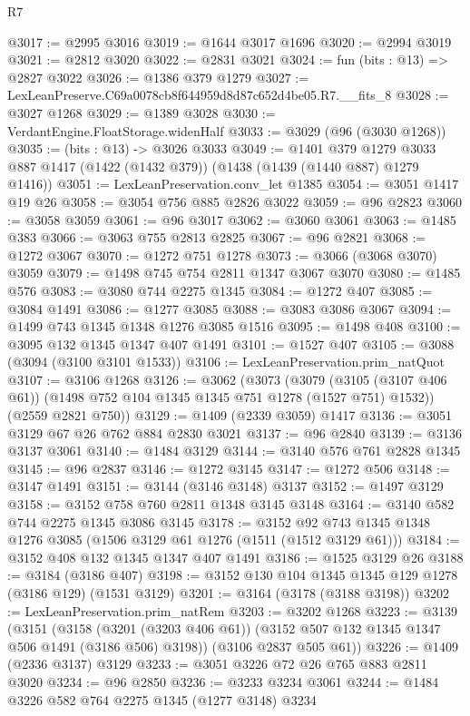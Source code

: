 \begin{lexlean}{R7}
\begin{coremodule}
@3017 := @2995 @3016
@3019 := @1644 @3017 @1696
@3020 := @2994 @3019
@3021 := @2812 @3020
@3022 := @2831 @3021
@3024 := fun (bits : @13) => @2827 @3022
@3026 := @1386 @379 @1279
@3027 := LexLeanPreserve.C69a0078cb8f644959d8d87c652d4be05.R7.__fits_8
@3028 := @3027 @1268
@3029 := @1389 @3028
@3030 := VerdantEngine.FloatStorage.widenHalf
@3033 := @3029 (@96 (@3030 @1268))
@3035 := (bits : @13) -> @3026 @3033
@3049 := @1401
    @379
    @1279
    @3033
    @887
    @1417
    (@1422 (@1432 @379))
    (@1438 (@1439 (@1440 @887) @1279 @1416))
@3051 := LexLeanPreservation.conv_let @1385
@3054 := @3051 @1417 @19 @26
@3058 := @3054 @756 @885 @2826 @3022
@3059 := @96 @2823
@3060 := @3058 @3059
@3061 := @96 @3017
@3062 := @3060 @3061
@3063 := @1485 @383
@3066 := @3063 @755 @2813 @2825
@3067 := @96 @2821
@3068 := @1272 @3067
@3070 := @1272 @751 @1278
@3073 := @3066 (@3068 @3070) @3059
@3079 := @1498 @745 @754 @2811 @1347 @3067 @3070
@3080 := @1485 @576
@3083 := @3080 @744 @2275 @1345
@3084 := @1272 @407
@3085 := @3084 @1491
@3086 := @1277 @3085
@3088 := @3083 @3086 @3067
@3094 := @1499 @743 @1345 @1348 @1276 @3085 @1516
@3095 := @1498 @408
@3100 := @3095 @132 @1345 @1347 @407 @1491
@3101 := @1527 @407
@3105 := @3088 (@3094 (@3100 @3101 @1533))
@3106 := LexLeanPreservation.prim_natQuot
@3107 := @3106 @1268
@3126 := @3062
    (@3073
      (@3079 (@3105 (@3107 @406 @61)) (@1498 @752 @104 @1345 @1345 @751 @1278 (@1527 @751) @1532))
      (@2559 @2821 @750))
@3129 := @1409 (@2339 @3059) @1417
@3136 := @3051 @3129 @67 @26 @762 @884 @2830 @3021
@3137 := @96 @2840
@3139 := @3136 @3137 @3061
@3140 := @1484 @3129
@3144 := @3140 @576 @761 @2828 @1345
@3145 := @96 @2837
@3146 := @1272 @3145
@3147 := @1272 @506
@3148 := @3147 @1491
@3151 := @3144 (@3146 @3148) @3137
@3152 := @1497 @3129
@3158 := @3152 @758 @760 @2811 @1348 @3145 @3148
@3164 := @3140 @582 @744 @2275 @1345 @3086 @3145
@3178 := @3152 @92 @743 @1345 @1348 @1276 @3085 (@1506 @3129 @61 @1276 (@1511 (@1512 @3129 @61)))
@3184 := @3152 @408 @132 @1345 @1347 @407 @1491
@3186 := @1525 @3129 @26
@3188 := @3184 (@3186 @407)
@3198 := @3152 @130 @104 @1345 @1345 @129 @1278 (@3186 @129) (@1531 @3129)
@3201 := @3164 (@3178 (@3188 @3198))
@3202 := LexLeanPreservation.prim_natRem
@3203 := @3202 @1268
@3223 := @3139
    (@3151
      (@3158 (@3201 (@3203 @406 @61)) (@3152 @507 @132 @1345 @1347 @506 @1491 (@3186 @506) @3198))
      (@3106 @2837 @505 @61))
@3226 := @1409 (@2336 @3137) @3129
@3233 := @3051 @3226 @72 @26 @765 @883 @2811 @3020
@3234 := @96 @2850
@3236 := @3233 @3234 @3061
@3244 := @1484 @3226 @582 @764 @2275 @1345 (@1277 @3148) @3234

\end{coremodule}
\end{lexlean}
